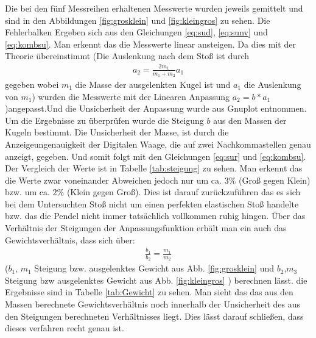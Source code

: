 Die bei den fünf Messreihen erhaltenen Messwerte wurden jeweils gemittelt und sind in den Abbildungen \ref{fig:grosklein} und \ref{fig:kleingros} zu sehen. Die Fehlerbalken Ergeben sich aus den Gleichungen \ref{eq:sud}, \ref{eq:sunv} und \ref{eq:kombsu}. 
Man erkennt das die Messwerte linear ansteigen. Da dies mit der Theorie übereinstimmt (Die Auslenkung nach dem Stoß ist durch
\begin{align}
	a_2= \frac{2m_1}{m_1+m_2} a_1\label{eq:Auslenkung}
\end{align} 
gegeben wobei $m_1$ die Masse der ausgelenkten Kugel ist und $a_1$ die Auslenkung von $m_1$)
wurden die Messwerte mit der Linearen Anpassung $a_2=b*a_1$)angepasst.Und die Unsicherheit der Anpassung wurde aus Gnuplot entnommen.
Um die Ergebnisse zu überprüfen wurde die Steigung $b$ aus den Massen der Kugeln bestimmt. Die Unsicherheit der Masse, ist durch die Anzeigeungenauigkeit der Digitalen Waage, die auf zwei Nachkommastellen genau anzeigt, gegeben. Und somit folgt mit den Gleichungen \ref{eq:sur} und \ref{eq:kombsu}. Der Vergleich der Werte ist in Tabelle \ref{tab:steigung} zu sehen.
Man erkennt das die Werte zwar voneinander Abweichen jedoch nur um ca. $3\%$ (Groß gegen Klein) bzw. um ca. $2\%$ (Klein gegen Groß). Dies ist darauf zurückzuführen das es sich bei dem Untersuchten Stoß nicht um einen perfekten elastischen Stoß handelte bzw. das die Pendel nicht immer tatsächlich vollkommen ruhig hingen.
Über das Verhältnis der Steigungen der Anpassungsfunktion erhält man ein auch das Gewichtsverhältnis, dass sich über: 
\begin{align}
\frac{b_1}{b_2}=\frac{m_1}{m_2}	
\end{align} 
($b_1$, $m_1$ Steigung bzw. ausgelenktes Gewicht aus Abb. \ref{fig:grosklein} und $b_2$,$m_3$ Steigung bzw ausgelenktes Gewicht aus Abb. \ref{fig:kleingros} ) berechnen lässt. die Ergebnisse sind in Tabelle \ref{tab:Gewicht} zu sehen.
Man sieht das das aus den Massen berechnete Gewichtsverhältnis  noch innerhalb der Unsicherheit des aus den Steigungen berechneten Verhältnisses liegt. Dies lässt darauf schließen, dass dieses verfahren recht genau ist.

